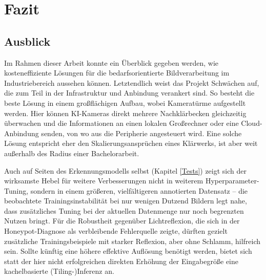 \chapter{Fazit} \label{Fazit}

\section{Ausblick}

Im Rahmen dieser Arbeit konnte ein Überblick gegeben werden, wie kosteneffiziente Lösungen für die bedarfsorientierte Bildverarbeitung im Industriebereich aussehen können. Letztendlich weist das Projekt Schwächen auf, die zum Teil in der Infrastruktur und Anbindung verankert sind. So besteht die beste Lösung in einem großflächigen Aufbau, wobei Kameratürme aufgestellt werden. Hier können KI-Kameras direkt mehrere Nachklärbecken gleichzeitig überwachen und die Informationen an einen lokalen Großrechner oder eine Cloud-Anbindung senden, von wo aus die Peripherie angesteuert wird. Eine solche Lösung entspricht eher den Skalierungsansprüchen eines Klärwerks, ist aber weit außerhalb des Radius einer Bachelorarbeit.

Auch auf Seiten des Erkennungsmodells selbst (Kapitel \ref{Tests}) zeigt sich der wirksamste Hebel für weitere Verbesserungen nicht in weiterem Hyperparameter-Tuning, sondern in einem größeren, vielfältigeren annotierten Datensatz -- die beobachtete Trainingsinstabilität bei nur wenigen Dutzend Bildern legt nahe, dass zusätzliches Tuning bei der aktuellen Datenmenge nur noch begrenzten Nutzen bringt. Für die Robustheit gegenüber Lichtreflexion, die sich in der Honeypot-Diagnose als verbleibende Fehlerquelle zeigte, dürften gezielt zusätzliche Trainingsbeispiele mit starker Reflexion, aber ohne Schlamm, hilfreich sein. Sollte künftig eine höhere effektive Auflösung benötigt werden, bietet sich statt der hier nicht erfolgreichen direkten Erhöhung der Eingabegröße eine kachelbasierte (Tiling-)Inferenz an.